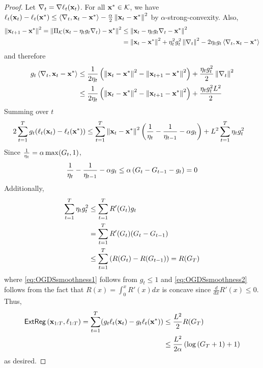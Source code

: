 \begin{proof}

Let $\nabla_t = \nabla \ell_t(\mathbf{x}_t)$.  For all $\mathbf{x}^* \in \mathcal{K}$, we have $\ell_t(\mathbf{x}_t)-\ell_t(\mathbf{x}^*) \leq \left \langle \nabla_t, \mathbf{x}_t-\mathbf{x}^* \right \rangle-\frac{\alpha}{2}\left\|\mathbf{x}_t-\mathbf{x}^*\right\|^2$ by $\alpha$-strong-convexity.  Also,
\begin{align*}
    \left\|\mathbf{x}_{t+1}-\mathbf{x}^*\right\|^2 = \left\|\Pi_{\mathcal{K}}(\mathbf{x}_t-\eta_t g_t\nabla_t)-\mathbf{x}^*\right\|^2 &\leq \left\|\mathbf{x}_t-\eta_t g_t\nabla_t-\mathbf{x}^*\right\|^2\\
    &=\left\|\mathbf{x}_t-\mathbf{x}^*\right\|^2+\eta_t^2g_t^2\left\|\nabla_t\right\|^2-2\eta_t g_t \left \langle \nabla_t,\mathbf{x}_t-\mathbf{x}^* \right \rangle
\end{align*}
and therefore
\begin{align*}
    g_t\left \langle \nabla_t, \mathbf{x}_t-\mathbf{x}^* \right \rangle &\leq \frac{1}{2\eta_t}\left(\left\|\mathbf{x}_t-\mathbf{x}^*\right\|^2-\left\|\mathbf{x}_{t+1}-\mathbf{x}^*\right\|^2\right)+\frac{\eta_t g_t^2}{2} \left\|\nabla_t\right\|^2\\
    &\leq \frac{1}{2\eta_t}\left(\left\|\mathbf{x}_t-\mathbf{x}^*\right\|^2-\left\|\mathbf{x}_{t+1}-\mathbf{x}^*\right\|^2\right)+\frac{\eta_t g_t^2L^2}{2}
\end{align*}
Summing over $t$
\begin{align*}
    2\sum_{t=1}^T g_t(\ell_t(\mathbf{x}_t)-\ell_t(\mathbf{x}^*))
    &\leq \sum_{t=1}^T \left\|\mathbf{x}_t-\mathbf{x}^*\right\|^2 \left(\frac{1}{\eta_t}-\frac{1}{\eta_{t-1}}-\alpha g_t\right)+ L^2\sum_{t=1}^T \eta_t g_t^2
\end{align*}
Since $\frac{1}{\eta_t} = \alpha \max(G_t,1)$, 
\begin{align*}
    \frac{1}{\eta_t}-\frac{1}{\eta_{t-1}}-\alpha g_t \leq \alpha \left(G_t -G_{t-1} - g_t\right) = 0
\end{align*}
Additionally,
\begin{align}
    \sum_{t=1}^T \eta_t g_t^2 &\leq \sum_{t=1}^T R'(G_t)g_t \label{eq:OGDSsmoothness1}\\
    &= \sum_{t=1}^T R'(G_t)(G_t-G_{t-1})\nonumber \\
    &\leq \sum_{t=1}^T \left(R(G_t)-R(G_{t-1})\right) = R(G_T)\label{eq:OGDSsmoothness2}
\end{align}
where \eqref{eq:OGDSsmoothness1} follows from $g_t \leq 1$ and \eqref{eq:OGDSsmoothness2} follows from the fact that $R(x) = \int_0^x R'(x)dx$ is concave since $\frac{d}{dx}R'(x) \leq 0$.  Thus,
\begin{align*}
    \mathsf{ExtReg}\left(\mathbf{x}_{1:T},\ell_{1:T}\right) = \sum_{t=1}^T (g_t \ell_t(\mathbf{x}_t)-g_t \ell_t(\mathbf{x}^*)) &\leq \frac{L^2}{2} R(G_T)\\
    &\leq \frac{L^2}{2\alpha}\left(\log\left(G_T+1\right)+1\right)
\end{align*}
as desired.\end{proof}


